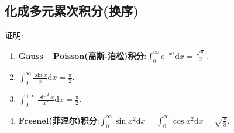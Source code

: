 \documentclass[../../main.tex]{subfiles}%
\begin{document}
\subsection{化成多元累次积分(换序)}

\begin{proposition}[重要定积分结论]\label{proposition:重要定积分结论}
证明:
\begin{enumerate}[(1)]
\item\label{proposition:重要定积分结论-1} $\mathbf{Gauss-Poisson}$\textbf{(高斯-泊松)积分}:\(\int_{0}^{\infty} e^{-x^{2}}\mathrm{d}x=\frac{\sqrt{\pi}}{2}\).

\item\label{proposition:重要定积分结论-2} \(\int_{0}^{\infty} \frac{\sin x}{x}\mathrm{d}x=\frac{\pi}{2}\).

\item\label{proposition:重要定积分结论-3} $\int_0^{+\infty}{\frac{\sin ^2x}{x^2}\mathrm{d}x}=\frac{\pi}{2}.$

\item\label{proposition:重要定积分结论-4} $\mathbf{Fresnel}$\textbf{(菲涅尔)积分}:\(\int_{0}^{\infty} \sin x^{2}\mathrm{d}x=\int_{0}^{\infty} \cos x^{2}\mathrm{d}x=\sqrt{\frac{\pi}{8}}\). 
\end{enumerate}
\end{proposition}
\end{document}
